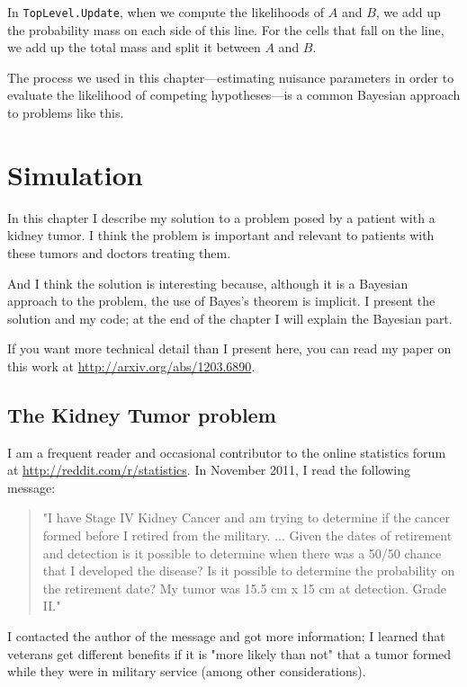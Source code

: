 \documentclass[12pt]{book}
\theoremstyle{exercise}
\begin{document}
In {\tt TopLevel.Update}, when we compute the likelihoods of $A$ and
$B$, we add up the probability mass on each side of this line.  For the
cells that fall on the line, we add up the total mass and split it
between $A$ and $B$.

The process we used in this chapter---estimating nuisance
parameters in order to evaluate the likelihood of competing
hypotheses---is a common Bayesian approach to problems like this.




\chapter{Simulation}

In this chapter I describe my solution to a problem posed
by a patient with a kidney tumor.  I think the problem is 
important and relevant to patients with these tumors
and doctors treating them.

And I think the solution is interesting because, although it
is a Bayesian approach to the problem, the use of Bayes's theorem
is implicit.  I present the solution and my code; at the end
of the chapter I will explain the Bayesian part.

If you want more technical detail than I present here, you can
read my paper on this work at \url{http://arxiv.org/abs/1203.6890}.


\section{The Kidney Tumor problem}

I am a frequent reader and occasional contributor to the online statistics
forum at \url{http://reddit.com/r/statistics}.  In November 2011, I read
the following message:

\begin{quote}
"I have Stage IV Kidney Cancer and am trying to determine if the
  cancer formed before I retired from the military. ... Given the
  dates of retirement and detection is it possible to determine when
  there was a 50/50 chance that I developed the disease? Is it
  possible to determine the probability on the retirement date?  My
  tumor was 15.5 cm x 15 cm at detection. Grade II."
\end{quote}

I contacted the author of the message and got more information; I learned
that veterans get different benefits if it is "more likely than not"
that a tumor formed while they were in military service (among other
considerations).
\end{document}
